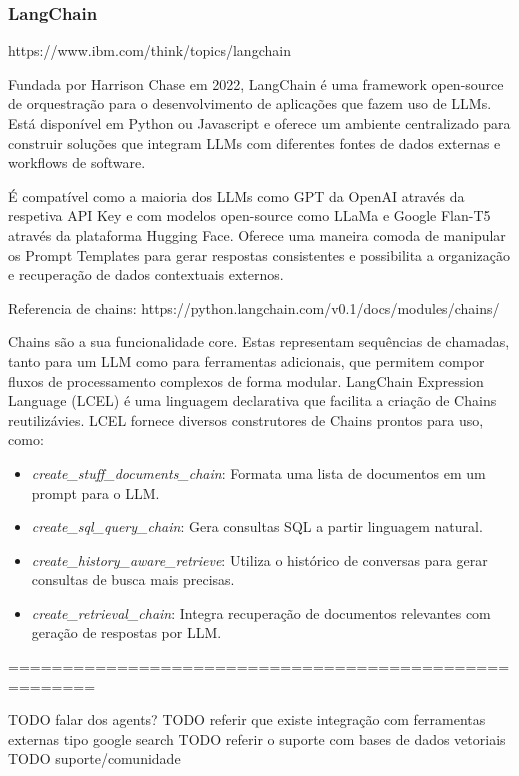\subsubsection{LangChain}


https://www.ibm.com/think/topics/langchain

Fundada por Harrison Chase em 2022, LangChain é uma framework open-source de orquestração para o desenvolvimento de aplicações que fazem uso de LLMs. Está disponível em Python ou Javascript e oferece um ambiente centralizado para construir soluções que integram LLMs com diferentes fontes de dados externas e workflows de software.

É compatível como a maioria dos LLMs como GPT da OpenAI através da respetiva API Key e com modelos open-source como LLaMa e Google Flan-T5 através da plataforma Hugging Face. 
Oferece uma maneira comoda de manipular os Prompt Templates para gerar respostas consistentes e possibilita a organização e recuperação de dados contextuais externos. 

Referencia de chains: https://python.langchain.com/v0.1/docs/modules/chains/

Chains são a sua funcionalidade core. Estas representam sequências de chamadas, tanto para um LLM como para ferramentas adicionais, que permitem compor fluxos de processamento complexos de forma modular. LangChain Expression Language (LCEL) é uma linguagem declarativa que facilita a criação de Chains reutilizávies. LCEL fornece diversos construtores de Chains prontos para uso, como: 

\begin{itemize}
	\item \textit{create\_stuff\_documents\_chain}: Formata uma lista de documentos em um prompt para o LLM.
	\item \textit{create\_sql\_query\_chain}: Gera consultas SQL a partir linguagem natural.
	\item \textit{create\_history\_aware\_retrieve}: Utiliza o histórico de conversas para gerar consultas de busca mais precisas.
	\item \textit{create\_retrieval\_chain}: Integra recuperação de documentos relevantes com geração de respostas por LLM.
\end{itemize}


======================================================

TODO falar dos agents? 
TODO referir que existe integração com ferramentas externas tipo google search 
TODO referir o suporte com bases de dados vetoriais
TODO suporte/comunidade


